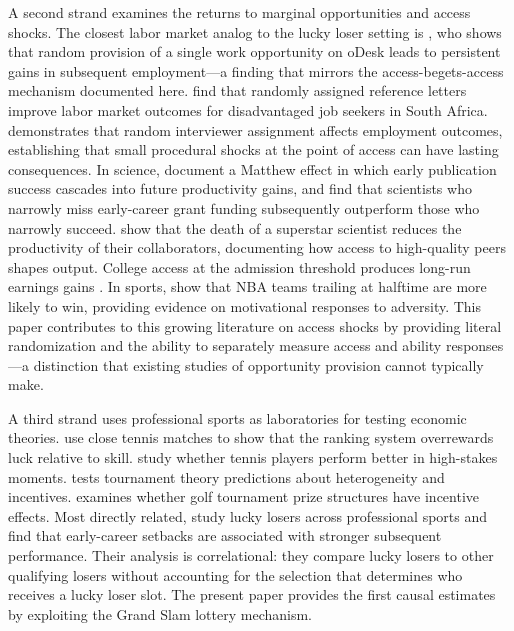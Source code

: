 A second strand examines the returns to marginal opportunities and access shocks. The closest labor market analog to the lucky loser setting is \citet{Pallais2014_inefficient_hiring}, who shows that random provision of a single work opportunity on oDesk leads to persistent gains in subsequent employment---a finding that mirrors the access-begets-access mechanism documented here. \citet{Abel2020_reference_letters} find that randomly assigned reference letters improve labor market outcomes for disadvantaged job seekers in South Africa. \citet{Startz2021_interviewer_effects} demonstrates that random interviewer assignment affects employment outcomes, establishing that small procedural shocks at the point of access can have lasting consequences. In science, \citet{Azoulay2014_matthew_effect} document a Matthew effect in which early publication success cascades into future productivity gains, and \citet{Wang2019_early_career_setback} find that scientists who narrowly miss early-career grant funding subsequently outperform those who narrowly succeed. \citet{Azoulay2010_superstar_extinction} show that the death of a superstar scientist reduces the productivity of their collaborators, documenting how access to high-quality peers shapes output. College access at the admission threshold produces long-run earnings gains \citep{Zimmerman2014_college_marginal, Hoekstra2009_flagship_earnings, Goodman2017_college_access}. In sports, \citet{Berger2011_can_losing} show that NBA teams trailing at halftime are more likely to win, providing evidence on motivational responses to adversity. This paper contributes to this growing literature on access shocks by providing literal randomization and the ability to separately measure access and ability responses---a distinction that existing studies of opportunity provision cannot typically make.

A third strand uses professional sports as laboratories for testing economic theories. \citet{Gauriot2019_fooled_randomness} use close tennis matches to show that the ranking system overrewards luck relative to skill. \citet{GonzalezDiaz2012_performing_best} study whether tennis players perform better in high-stakes moments. \citet{Sunde2009_heterogeneity_tennis} tests tournament theory predictions about heterogeneity and incentives. \citet{Ehrenberg1990_tournaments_golf} examines whether golf tournament prize structures have incentive effects. Most directly related, \citet{Maity2025_early_career_sports} study lucky losers across professional sports and find that early-career setbacks are associated with stronger subsequent performance. Their analysis is correlational: they compare lucky losers to other qualifying losers without accounting for the selection that determines who receives a lucky loser slot. The present paper provides the first causal estimates by exploiting the Grand Slam lottery mechanism.

